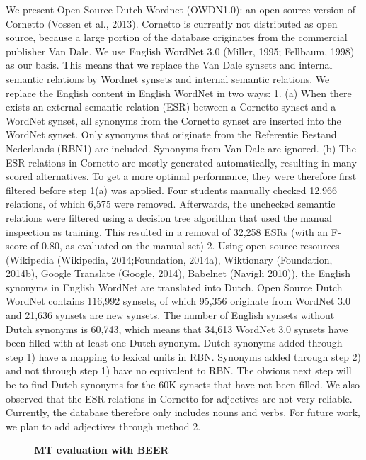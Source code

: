 \documentclass[10pt, a4paper, twopage, headinclude, footinclude, BCOR5mm]{scrartcl}
\begin{document}
\noindent
We present Open Source Dutch Wordnet (OWDN1.0): an open source version of Cornetto (Vossen et al., 2013). Cornetto is currently not distributed as open source, because a large portion of the database originates from the commercial publisher Van Dale.  We use English WordNet 3.0 (Miller, 1995; Fellbaum, 1998) as our basis. This means that we replace the Van Dale synsets and internal semantic relations by Wordnet synsets and internal semantic relations.  We replace the English content in English WordNet in two ways: 1. (a)  When there exists an external semantic relation (ESR) between a Cornetto synset and a WordNet synset, all synonyms from the Cornetto synset are inserted into the WordNet synset. Only synonyms that originate from the Referentie Bestand Nederlands (RBN1) are included. Synonyms from Van Dale are ignored.  (b) The ESR relations in Cornetto are mostly generated automatically, resulting in many scored alternatives. To get a more optimal performance, they were therefore first filtered before step 1(a) was applied. Four students manually checked 12,966 relations, of which 6,575 were removed. Afterwards, the unchecked semantic relations were filtered using a decision tree algorithm that used the manual inspection as training. This resulted in a removal of 32,258 ESRs (with an F-score of 0.80, as evaluated on the manual set) 2. Using open source resources (Wikipedia (Wikipedia, 2014;Foundation, 2014a), Wiktionary (Foundation, 2014b), Google Translate (Google, 2014), Babelnet (Navigli 2010)), the English synonyms in English WordNet are translated into Dutch.  Open Source Dutch WordNet contains 116,992 synsets, of which 95,356 originate from WordNet 3.0 and 21,636 synsets are new synsets. The number of English synsets without Dutch synonyms is 60,743, which means that 34,613 WordNet 3.0 synsets have been filled with at least one Dutch synonym. Dutch synonyms added through step 1) have a mapping to lexical units in RBN. Synonyms added through step 2) and not through step 1) have no equivalent to RBN. 	The obvious next step will be to find Dutch synonyms for the 60K synsets that have not been filled. We also observed that the ESR relations in Cornetto for adjectives are not very reliable. Currently, the database therefore only includes nouns and verbs. For future work, we plan to add adjectives through method 2.


\newpage

\begin{figure}[t!]
\centering
\large\textbf{MT evaluation with BEER}
\vspace*{0.5cm}
\end{figure}
\end{document}
